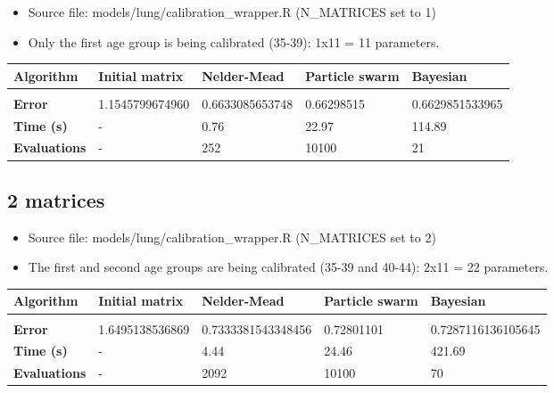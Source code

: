 \begin{itemize}
	\item Source file: models/lung/calibration\_wrapper.R (N\_MATRICES set to 1)
	\item Only the first age group is being calibrated (35-39): 1x11 = 11 parameters.
\end{itemize}

\begin{table}[h]
	\begin{tabular}{p{2cm}|l|l|l|l}
		\textbf{Algorithm} 		& \textbf{Initial matrix} & \textbf{Nelder-Mead} 		& \textbf{Particle swarm} 	& \textbf{Bayesian} \\
		\hline \\
		\textbf{Error}	& 1.1545799674960& 0.6633085653748	& \cellcolor{green}0.66298515		& \cellcolor{green}0.6629851533965 \\
		\textbf{Time (s)} & - & \cellcolor{green}0.76 & 22.97 & \cellcolor{red!20}114.89 \\
		\textbf{Evaluations} & - & 252 & \cellcolor{red!20}10100 & \cellcolor{green}21 \\
	\end{tabular}
\end{table}

\subsection{2 matrices}

\begin{itemize}
	\item Source file: models/lung/calibration\_wrapper.R (N\_MATRICES set to 2)
	\item The first and second age groups are being calibrated (35-39 and 40-44): 2x11 = 22 parameters.
\end{itemize}


\begin{table}[h]
	\begin{tabular}{p{2cm}|l|l|l|l}
		\textbf{Algorithm} 		& \textbf{Initial matrix} & \textbf{Nelder-Mead} 		& \textbf{Particle swarm} 	& \textbf{Bayesian} \\
		\hline \\
		\textbf{Error}	& 1.6495138536869 & 0.7333381543348456 & \cellcolor{green}0.72801101 & \cellcolor{green}0.7287116136105645 \\
		\textbf{Time (s)} & - & \cellcolor{green}4.44 & 24.46 & \cellcolor{red!20}421.69 \\
		\textbf{Evaluations} & - & 2092 & \cellcolor{green}10100 & \cellcolor{green}70 \\
	\end{tabular}
\end{table}

